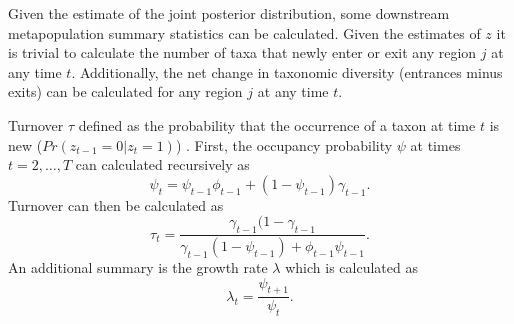 \documentclass[12pt,letterpaper]{article}
\begin{document}



Given the estimate of the joint posterior distribution, some downstream metapopulation summary statistics can be calculated. Given the estimates of \(z\) it is trivial to calculate the number of taxa that newly enter or exit any region \(j\) at any time \(t\). Additionally, the net change in taxonomic diversity (entrances minus exits) can be calculated for any region \(j\) at any time \(t\).

Turnover \(\tau\) defined as the probability that the occurrence of a taxon at time \(t\) is new (\(Pr(z_{t - 1} = 0 | z_{t} = 1)\)) \citep{Royle2008}. First, the occupancy probability \(\psi\) at times \(t = 2, \dots, T\) can calculated recursively as
\begin{equation}
  \psi_{t} = \psi_{t - 1}\phi_{t - 1} + (1 - \psi_{t - 1})\gamma_{t - 1}.
\end{equation}
Turnover can then be calculated as
\begin{equation}
  \tau_{t} = \frac{\gamma_{t - 1} (1 - \gamma_{t - 1}}{\gamma_{t - 1} (1 - \psi_{t - 1}) + \phi_{t - 1} \psi_{t - 1}}.
\end{equation}
An additional summary is the growth rate \(\lambda\) \citep{MacKenzie2003,Royle2008} which is calculated as
\begin{equation}
  \lambda_{t} = \frac{\psi_{t + 1}}{\psi_{t}}.
\end{equation}

\end{document}
